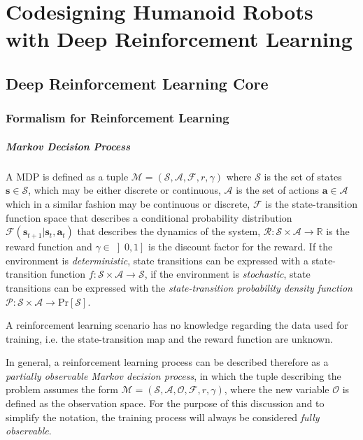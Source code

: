 \chapter{Codesigning Humanoid Robots with Deep Reinforcement Learning}
\label{chp:CodesignRL}

\section{Deep Reinforcement Learning Core}
\subsection{Formalism for Reinforcement Learning}

\paragraph{Markov Decision Process} A \ac{MDP} is defined as a tuple $\mathcal{M} = (\mathcal{S}, \mathcal{A}, \mathcal{F}, r, \gamma)$ where $\mathcal{S}$ is the set of states $\mathbf{s} \in \mathcal{S}$, which may be either discrete or continuous, $\mathcal{A}$ is the set of actions $\mathbf{a} \in \mathcal{A}$ which in a similar fashion may be continuous or discrete, $\mathcal{F}$ is the state-transition function space that describes a conditional probability distribution $\mathcal{F}(\mathbf{s} _{t+1}|\mathbf{s}_t, \mathbf{a} _t)$ that describes the dynamics of the system, $\mathcal{R} : \mathcal{S} \times \mathcal{A} \rightarrow \mathbb{R}$ is the reward function and $\gamma \in \left]0,1\right]$ is the discount factor for the reward. If the environment is \textit{deterministic}, state transitions can be expressed with a state-transition function $f: \mathcal{S} \times \mathcal{A} \rightarrow \mathcal{S}$, if the environment is \textit{stochastic}, state transitions can be expressed with the \textit{state-transition probability density function} $\mathcal{P}: \mathcal{S} \times \mathcal{A} \rightarrow \mathrm{Pr}[\mathcal{S}]$.

A reinforcement learning scenario has no knowledge regarding the data used for training, i.e. the state-transition map and the reward function are unknown.

In general, a reinforcement learning process can be described therefore as a \textit{partially observable Markov decision process}, in which the tuple describing the problem assumes the form $\mathcal{M} =  (\mathcal{S}, \mathcal{A}, \mathcal{O}, \mathcal{F}, r, \gamma)$, where the new variable $\mathcal{O}$ is defined as the observation space. For the purpose of this discussion and to simplify the notation, the training process will always be considered \textit{fully observable}.

